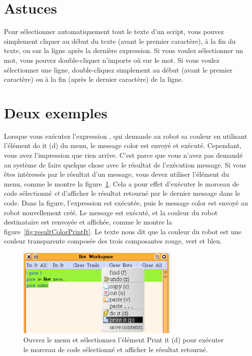 \documentclass[a4paper,10pt,twoside]{book}
\begin{document}
\section{Astuces}

Pour s\'electionner automatiquement tout le texte d'un script, vous pouvez simplement cliquer au d\'ebut du texte (avant le premier caract\`ere), \`a la fin du texte, ou sur la ligne apr\`es la derni\`ere expression. Si vous voulez s\'electionner un mot, vous pouvez double-cliquer n'importe o\`u sur le mot. Si vous voulez s\'electionner une ligne, double-cliquez simplement au d\'ebut (avant le premier caract\`ere) ou \`a la fin (apr\`es le dernier caract\`ere) de la ligne. 

\section{Deux exemples }

Lorsque vous ex\'ecutez l'expression , qui demande au robot sa couleur en utilisant l'\'el\'ement do it (d) du menu, le message color est envoy\'e et ex\'ecut\'e. Cependant, vous avez l'impression que rien arrive. C'est parce que vous n'avez pas demand\'e au syst\`eme de faire quelque chose avec le r\'esultat de l'ex\'ecution message. Si vous \^etes int\'eress\'es par le r\'esultat d'un message, vous devez utiliser l'\'el\'ement  du menu, comme le montre la figure~\ref{fig:colorPrintIt}. Cela a pour effet d'ex\'ecuter le morceau de code s\'electionn\'e \emph{et} d'afficher le r\'esultat retourn\'e par le dernier message dans le code. Dans la figure, l'expression  est ex\'ecut\'ee, puis le message color est envoy\'e au robot nouvellement cr\'e\'e. Le message  est ex\'ecut\'e, et la couleur du robot destinataire est renvoy\'ee et affich\'ee, comme le montre la figure~\ref{fig:resultColorPrintIt}. Le texte  nous dit que la couleur du robot est une couleur transparente compos\'ee des trois composantes rouge, vert et bleu. 

\begin{figure}
\centerline{\includegraphics[width=8cm]{colorPrintIt}} 
\caption{Ouvrez le menu et s\'electionnez l'\'el\'ement Print it (d) pour ex\'ecuter le morceau de code s\'electionn\'e et afficher le r\'esultat retourn\'e.  \label{fig:colorPrintIt}}
\end{figure}
\end{document}
